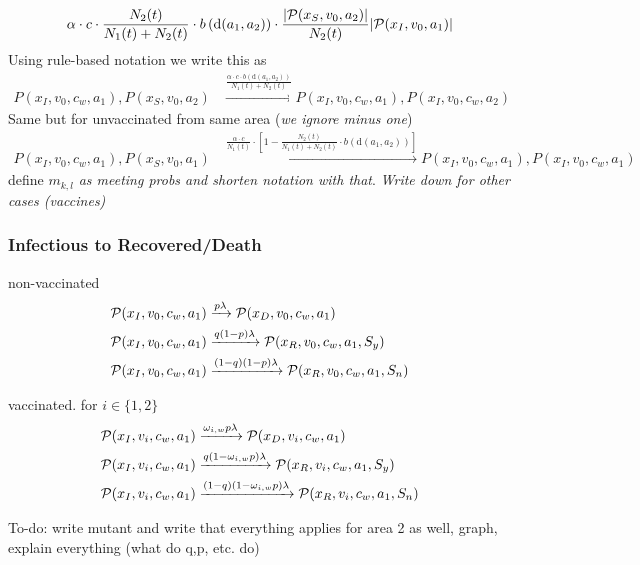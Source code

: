 \begin{align*}
\alpha \cdot c \cdot \frac{N_{2}(t)}{N_1(t) + N_2(t)} \cdot b\left(\text{d}(a_1, a_2) \right) \cdot \frac{|\mathcal{P}(x_S, v_0, a_2)|}{N_2(t)} |\mathcal{P}(x_I, v_0, a_1)|
\end{align*}
Using rule-based notation we write this as 
\begin{align*}
P(x_{I},  v_0, c_w,a_1), P(x_{S}, v_0, a_2) &\xrightarrow{ \frac{\alpha \cdot c \cdot b\left(\text{d}(a_1, a_2) \right)}{N_1(t) + N_2(t)} } P(x_{I},v_0, c_w,a_1), P(x_{I}, v_0, c_w, a_2)
\end{align*}
Same but for unvaccinated from same area (\textit{we ignore minus one})
\begin{align*}
P(x_{I},  v_0, c_w,a_1), P(x_{S}, v_0, a_1) &\xrightarrow{\frac{\alpha \cdot c}{N_1(t)} \cdot \left[1 - \frac{N_{2}(t)}{N_1(t) + N_2(t)} \cdot b\left(\text{d}(a_1, a_2) \right) \right]} P(x_{I},  v_0, c_w,a_1), P(x_{I},  v_0, c_w,a_1)
\end{align*}
define $m_{k,l}$ \textit{as meeting probs and shorten notation with that}.
\textit{Write down for other cases (vaccines)}


\subsubsection*{Infectious to Recovered/Death}
non-vaccinated
\begin{align}
    \mathcal{P}(x_I,  v_0, c_w, a_1) &\xrightarrow{p \lambda} \mathcal{P}(x_D,  v_0, c_w, a_1) \notag \\
\mathcal{P}(x_I,  v_0, c_w, a_1) &\xrightarrow{q(1-p) \lambda} \mathcal{P}(x_R,  v_0, c_w, a_1, S_y) \notag \\
\mathcal{P}(x_I,  v_0, c_w, a_1) &\xrightarrow{(1-q)(1-p) \lambda} \mathcal{P}(x_R,  v_0, c_w, a_1, S_n) \notag
\end{align}

vaccinated. for $i \in \{1,2\}$
\begin{align}
    \mathcal{P}(x_I,  v_i, c_w, a_1) &\xrightarrow{\omega_{i,w} p \lambda} \mathcal{P}(x_D,  v_i, c_w, a_1) \notag \\
\mathcal{P}(x_I,  v_i, c_w, a_1) &\xrightarrow{q(1-\omega_{i,w}p) \lambda} \mathcal{P}(x_R,  v_i, c_w, a_1, S_y) \notag \\
\mathcal{P}(x_I,  v_i, c_w, a_1) &\xrightarrow{(1-q)(1-\omega_{i,w}p) \lambda} \mathcal{P}(x_R,  v_i, c_w, a_1, S_n) \notag
\end{align}


To-do: write mutant and write that everything applies for area 2 as well, graph, explain everything (what do q,p, etc. do)



